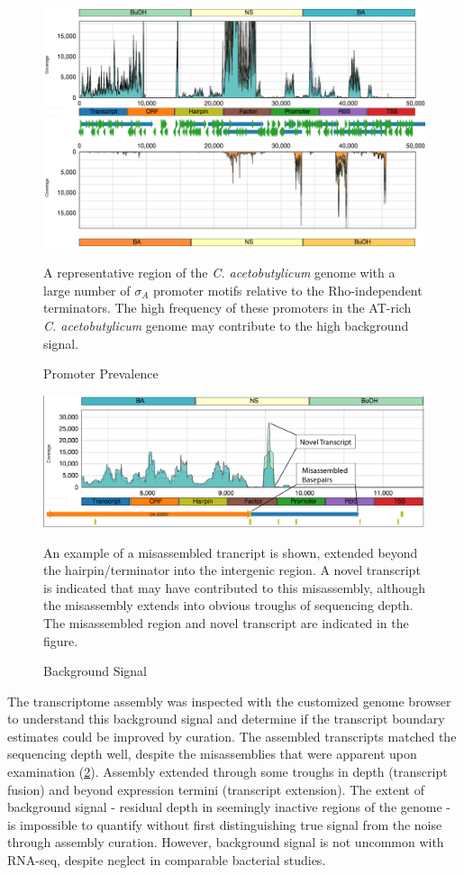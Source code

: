 \begin{figure}
\includegraphics[width=\textwidth]{images/Assembly/Background_signal/promoter_prevalence.png}
\caption{Promoter Prevalence}\label{fig:5.7}
\small
A representative region of the \textit{C. acetobutylicum} genome with a large number of $\sigma_{A}$ promoter motifs relative to the Rho-independent terminators. The high frequency of these promoters in the AT-rich \textit{C. acetobutylicum} genome may contribute to the high background signal.
\end{figure}

\begin{figure}
\includegraphics[width=\textwidth]{images/Assembly/Background_signal/Background_signal.png}
\caption{Background Signal}\label{fig:5.8}
\small
An example of a misassembled trancript is shown, extended beyond the hairpin/terminator into the intergenic region. A novel transcript is indicated that may have contributed to this misassembly, although the misassembly extends into obvious troughs of sequencing depth. The misassembled region and novel transcript are indicated in the figure.
\end{figure}

The transcriptome assembly was inspected with the customized genome browser to understand this background signal and determine if the transcript boundary estimates could be improved by curation. The assembled transcripts matched the sequencing depth well, despite the misassemblies that were apparent upon examination (\ref{fig:5.8}). Assembly extended through some troughs in depth (transcript fusion) and beyond expression termini (transcript extension). The extent of background signal - residual depth in seemingly inactive regions of the genome - is impossible to quantify without first distinguishing true signal from the noise through assembly curation. However, background signal is not uncommon with RNA-seq,\cite{110,176,163,164} despite neglect in comparable bacterial studies.

